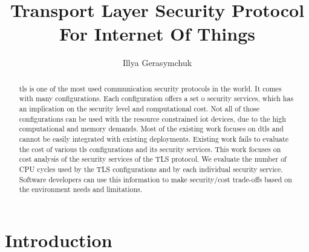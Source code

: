 \documentclass{llncs}
\begin{document}
%
\frontmatter          %
%
\pagestyle{headings}  %
%

\tableofcontents
\newpage

\mainmatter              %
%
\title{Transport Layer Security Protocol For Internet Of Things}
%
%
\author{{Illya Gerasymchuk} \\
}
%
%
%
\maketitle              %

\begin{abstract}
\gls{tls} is one of the most used communication security protocols in the world. It comes with many configurations. 
Each configuration offers a set o security services, which has an implication on the 
security level and computational cost.
Not all of those configurations can be used with the resource constrained \gls{iot} devices, due to the
high computational and memory demands. Most of the existing work focuses on \gls{dtls}
and cannot be easily integrated with existing deployments. Existing work fails
to evaluate the cost of various \gls{tls} configurations and its security services.
This work focuses on cost analysis of the security services of the TLS protocol.
We evaluate the number of CPU cycles used by the TLS configurations
and by each individual security service. Software developers can use this information
to make security/cost trade-offs based on the environment needs and limitations.  

\end{abstract}
%

\section{Introduction}
%
\end{document}
